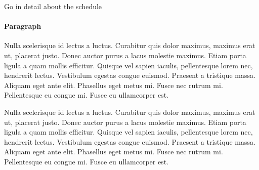 \documentclass[11pt,sigconf]{acmart}
\begin{document}
Go in detail about the schedule



\paragraph{Paragraph}

Nulla scelerisque id lectus a luctus.
Curabitur quis dolor maximus, maximus erat ut, placerat justo.
Donec auctor purus a lacus molestie maximus.
Etiam porta ligula a quam mollis efficitur.
Quisque vel sapien iaculis, pellentesque lorem nec, hendrerit lectus.
Vestibulum egestas congue euismod.
Praesent a tristique massa.
Aliquam eget ante elit.
Phasellus eget metus mi.
Fusce nec rutrum mi.
Pellentesque eu congue mi.
Fusce eu ullamcorper est.

Nulla scelerisque id lectus a luctus.
Curabitur quis dolor maximus, maximus erat ut, placerat justo.
Donec auctor purus a lacus molestie maximus.
Etiam porta ligula a quam mollis efficitur.
Quisque vel sapien iaculis, pellentesque lorem nec, hendrerit lectus.
Vestibulum egestas congue euismod.
Praesent a tristique massa.
Aliquam eget ante elit.
Phasellus eget metus mi.
Fusce nec rutrum mi.
Pellentesque eu congue mi.
Fusce eu ullamcorper est.



 
\end{document}
